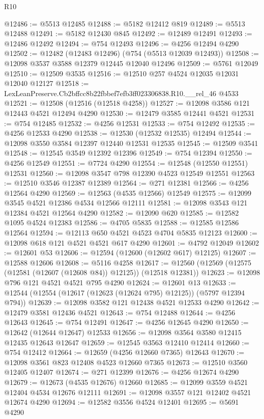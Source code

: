 \begin{lexlean}{R10}
\begin{coremodule}
@12486 := @5513 @12485
@12488 := @5182 @12412 @819
@12489 := @5513 @12488
@12491 := @5182 @12430 @845
@12492 := @12489 @12491
@12493 := @12486 @12492
@12494 := @754 @12493
@12496 := @4256 @12494 @4290
@12502 := @12482 (@12483 @12496) (@754 (@5513 @12039 @12493))
@12508 := @12098 @3537 @3588 @12379 @12445 @12040 @12496
@12509 := @5761 @12049
@12510 := @12509 @3535
@12516 := @12510 @257 @4524 @12035 @12031 @12040 @12127
@12518 := LexLeanPreserve.Cb2bffcc8b22fbbef7efb3ff023306838.R10.__rel_46 @4533
@12521 := @12508 (@12516 (@12518 @4258))
@12527 := @12098 @3586 @121 @12443 @4521 @12494 @4290
@12530 := @12479 @3585 @12441 @4521
@12531 := @754 @12485
@12532 := @4256 @12531
@12533 := @754 @12492
@12535 := @4256 @12533 @4290
@12538 := @12530 (@12532 @12535) @12494
@12544 := @12098 @3550 @3584 @12397 @12440 @12531 @12535
@12545 := @12509 @3541
@12548 := @12545 @3549 @12392 @12396
@12549 := @754 @12394
@12550 := @4256 @12549
@12551 := @7724 @4290
@12554 := @12548 (@12550 @12551) @12531
@12560 := @12098 @3547 @798 @12390 @4523 @12549 @12551
@12563 := @12510 @3546 @12387 @12389
@12564 := @271 @12381
@12566 := @4256 @12564 @4290
@12569 := @12563 (@4535 @12566) @12549
@12575 := @12099 @3545 @4521 @12386 @4534 @12566 @12111
@12581 := @12098 @3543 @121 @12384 @4521 @12564 @4290
@12582 := @12090 @620
@12585 := @12582 @1095 @4524 @12383
@12586 := @4705 @5835
@12588 := @12585 @12586 @12564
@12594 := @12113 @650 @4521 @4523 @4704 @5835 @12123
@12600 := @12098 @618 @121 @4521 @4521 @617 @4290
@12601 := @4792 @12049
@12602 := @12601 @53
@12606 := @12594 (@12600 (@12602 @617) @12125)
@12607 := @12588 @12606
@12608 := @5116 @4258
@12617 := @12560 (@12569 (@12575 (@12581 (@12607 (@12608 @84)) @12125)) (@12518 @12381))
@12623 := @12098 @796 @121 @4521 @4521 @795 @4290
@12624 := @12601 @13
@12633 := @12544 (@12554 (@12617 (@12623 (@12624 @795) @12125)) (@5797 @12394 @794))
@12639 := @12098 @3582 @121 @12438 @4521 @12533 @4290
@12642 := @12479 @3581 @12436 @4521
@12643 := @754 @12488
@12644 := @4256 @12643
@12645 := @754 @12491
@12647 := @4256 @12645 @4290
@12650 := @12642 (@12644 @12647) @12533
@12656 := @12098 @3564 @3580 @12415 @12435 @12643 @12647
@12659 := @12545 @3563 @12410 @12414
@12660 := @754 @12412
@12664 := @12659 (@4256 @12660 @7365) @12643
@12670 := @12098 @3561 @823 @12408 @4523 @12660 @7365
@12673 := @12510 @3560 @12405 @12407
@12674 := @271 @12399
@12676 := @4256 @12674 @4290
@12679 := @12673 (@4535 @12676) @12660
@12685 := @12099 @3559 @4521 @12404 @4534 @12676 @12111
@12691 := @12098 @3557 @121 @12402 @4521 @12674 @4290
@12694 := @12582 @3556 @4524 @12401
@12695 := @5691 @4290

\end{coremodule}
\end{lexlean}
